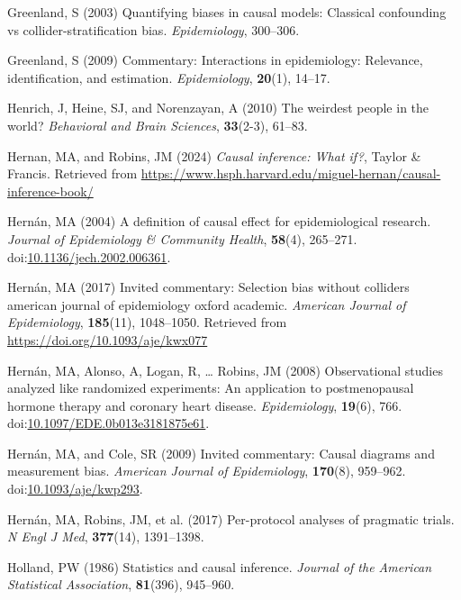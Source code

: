 \documentclass[
  single column]{article}
\newlength{\cslhangindent}
\newenvironment{CSLReferences}[2] %
 {\begin{list}{}{%
  \setlength{\itemindent}{0pt}
  \setlength{\leftmargin}{0pt}
  \setlength{\parsep}{0pt}
  \ifodd #1
   \setlength{\leftmargin}{\cslhangindent}
   \setlength{\itemindent}{-1\cslhangindent}
  \fi
  \setlength{\itemsep}{#2\baselineskip}}}
 {\end{list}}
\begin{document}
\begin{CSLReferences}{1}{0}
Greenland, S (2003) Quantifying biases in causal models: Classical
confounding vs collider-stratification bias. \emph{Epidemiology},
300--306.

Greenland, S (2009) Commentary: Interactions in epidemiology: Relevance,
identification, and estimation. \emph{Epidemiology}, \textbf{20}(1),
14--17.

Henrich, J, Heine, SJ, and Norenzayan, A (2010) The weirdest people in
the world? \emph{Behavioral and Brain Sciences}, \textbf{33}(2-3),
61--83.

Hernan, MA, and Robins, JM (2024) \emph{Causal inference: What if?},
Taylor \& Francis. Retrieved from
\url{https://www.hsph.harvard.edu/miguel-hernan/causal-inference-book/}

Hernán, MA (2004) A definition of causal effect for epidemiological
research. \emph{Journal of Epidemiology \& Community Health},
\textbf{58}(4), 265--271.
doi:\href{https://doi.org/10.1136/jech.2002.006361}{10.1136/jech.2002.006361}.

Hernán, MA (2017) Invited commentary: Selection bias without colliders
\textbar{} american journal of epidemiology \textbar{} oxford academic.
\emph{American Journal of Epidemiology}, \textbf{185}(11), 1048--1050.
Retrieved from \url{https://doi.org/10.1093/aje/kwx077}

Hernán, MA, Alonso, A, Logan, R, \ldots{} Robins, JM (2008)
Observational studies analyzed like randomized experiments: An
application to postmenopausal hormone therapy and coronary heart
disease. \emph{Epidemiology}, \textbf{19}(6), 766.
doi:\href{https://doi.org/10.1097/EDE.0b013e3181875e61}{10.1097/EDE.0b013e3181875e61}.

Hernán, MA, and Cole, SR (2009) Invited commentary: Causal diagrams and
measurement bias. \emph{American Journal of Epidemiology},
\textbf{170}(8), 959--962.
doi:\href{https://doi.org/10.1093/aje/kwp293}{10.1093/aje/kwp293}.

Hernán, MA, Robins, JM, et al. (2017) Per-protocol analyses of pragmatic
trials. \emph{N Engl J Med}, \textbf{377}(14), 1391--1398.

Holland, PW (1986) Statistics and causal inference. \emph{Journal of the
American Statistical Association}, \textbf{81}(396), 945--960.


\end{CSLReferences}
\end{document}
